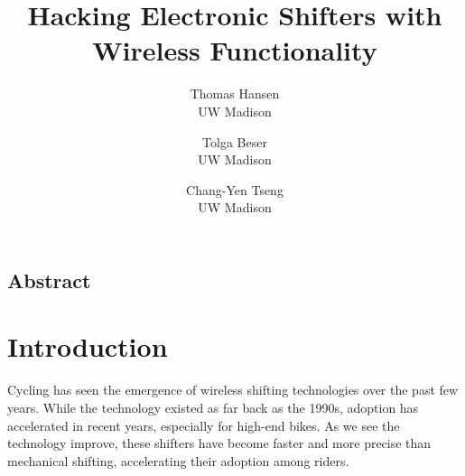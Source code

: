 \documentclass[letterpaper,twocolumn,10pt]{article}
\begin{document}
\date{}

\title{\Large \bf Hacking Electronic Shifters with Wireless Functionality }

\author{
  {\rm Thomas Hansen}\\
  UW Madison
  \and
  {\rm Tolga Beser}\\
  UW Madison
  \and
  {\rm Chang-Yen Tseng}\\
  UW Madison
} %

\maketitle

\thispagestyle{empty}


\subsection*{Abstract}


\section{Introduction}



Cycling has seen the emergence of wireless shifting technologies over the past few years. While the technology existed as far back as the 1990s, adoption has accelerated in recent years, especially for high-end bikes. As we see the technology improve, these shifters have become faster and more precise than mechanical shifting, accelerating their adoption among riders.
\end{document}
